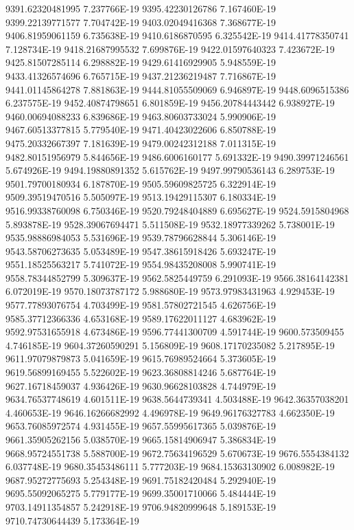 9391.62320481995  7.237766E-19
9395.42230126786  7.167460E-19
9399.22139771577  7.704742E-19
9403.02049416368  7.368677E-19
9406.81959061159  6.735638E-19
9410.6186870595  6.325542E-19
9414.41778350741  7.128734E-19
9418.21687995532  7.699876E-19
9422.01597640323  7.423672E-19
9425.81507285114  6.298882E-19
9429.61416929905  5.948559E-19
9433.41326574696  6.765715E-19
9437.21236219487  7.716867E-19
9441.01145864278  7.881863E-19
9444.81055509069  6.946897E-19
9448.6096515386  6.237575E-19
9452.40874798651  6.801859E-19
9456.20784443442  6.938927E-19
9460.00694088233  6.839686E-19
9463.80603733024  5.990906E-19
9467.60513377815  5.779540E-19
9471.40423022606  6.850788E-19
9475.20332667397  7.181639E-19
9479.00242312188  7.011315E-19
9482.80151956979  5.844656E-19
9486.6006160177  5.691332E-19
9490.39971246561  5.674926E-19
9494.19880891352  5.615762E-19
9497.99790536143  6.289753E-19
9501.79700180934  6.187870E-19
9505.59609825725  6.322914E-19
9509.39519470516  5.505097E-19
9513.19429115307  6.180334E-19
9516.99338760098  6.750346E-19
9520.79248404889  6.695627E-19
9524.5915804968  5.893878E-19
9528.39067694471  5.511508E-19
9532.18977339262  5.738001E-19
9535.98886984053  5.531696E-19
9539.78796628844  5.306146E-19
9543.58706273635  5.053489E-19
9547.38615918426  5.693247E-19
9551.18525563217  5.741072E-19
9554.98435208008  5.990741E-19
9558.78344852799  5.309637E-19
9562.5825449759  6.291093E-19
9566.38164142381  6.072019E-19
9570.18073787172  5.988680E-19
9573.97983431963  4.929453E-19
9577.77893076754  4.703499E-19
9581.57802721545  4.626756E-19
9585.37712366336  4.653168E-19
9589.17622011127  4.683962E-19
9592.97531655918  4.673486E-19
9596.77441300709  4.591744E-19
9600.573509455  4.746185E-19
9604.37260590291  5.156809E-19
9608.17170235082  5.217895E-19
9611.97079879873  5.041659E-19
9615.76989524664  5.373605E-19
9619.56899169455  5.522602E-19
9623.36808814246  5.687764E-19
9627.16718459037  4.936426E-19
9630.96628103828  4.744979E-19
9634.76537748619  4.601511E-19
9638.5644739341  4.503488E-19
9642.36357038201  4.460653E-19
9646.16266682992  4.496978E-19
9649.96176327783  4.662350E-19
9653.76085972574  4.931455E-19
9657.55995617365  5.039876E-19
9661.35905262156  5.038570E-19
9665.15814906947  5.386834E-19
9668.95724551738  5.588700E-19
9672.75634196529  5.670673E-19
9676.5554384132  6.037748E-19
9680.35453486111  5.777203E-19
9684.15363130902  6.008982E-19
9687.95272775693  5.254348E-19
9691.75182420484  5.292940E-19
9695.55092065275  5.779177E-19
9699.35001710066  5.484444E-19
9703.14911354857  5.242918E-19
9706.94820999648  5.189153E-19
9710.74730644439  5.173364E-19
